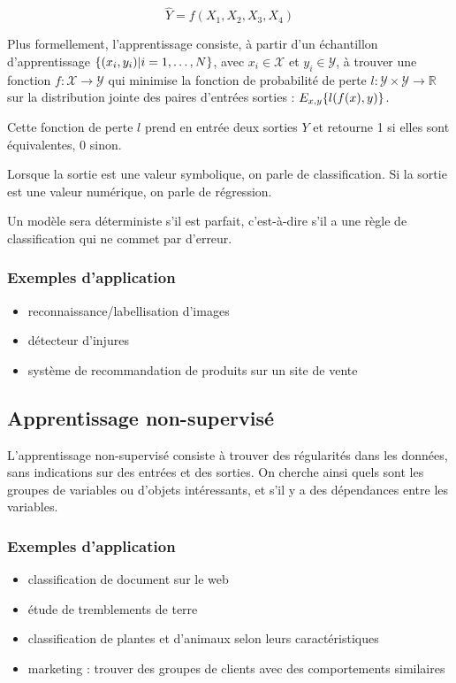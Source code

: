 		$$\hat{Y} = f(X_1, X_2, X_3, X_4)$$

		Plus formellement, l'apprentissage consiste, à partir d'un échantillon d'apprentissage $\lbrace (x_i, y_i) \vert i = 1, \dots , N \rbrace$, avec $x_i \in \mathcal{X}$ et $y_i \in \mathcal{Y}$, à trouver une fonction $f : \mathcal{X} \rightarrow \mathcal{Y}$ qui minimise la fonction de probabilité de perte $l : \mathcal{Y} \times \mathcal{Y} \rightarrow \mathbb{R}$ sur la distribution jointe des paires d'entrées sorties : $E_{x, y} \lbrace l(f(x), y) \rbrace$.

		Cette fonction de perte $l$ prend en entrée deux sorties $Y$ et retourne 1 si elles sont équivalentes, 0 sinon.

		Lorsque la sortie est une valeur symbolique, on parle de classification. Si la sortie est une valeur numérique, on parle de régression.

		Un modèle sera déterministe s'il est parfait, c'est-à-dire s'il a une règle de classification qui ne commet par d'erreur.
		
		\subsubsection{Exemples d'application}
			
			\begin{itemize}
				\item reconnaissance/labellisation d'images
				\item détecteur d'injures
				\item système de recommandation de produits sur un site de vente
			\end{itemize}
		
		
		\subsection{Apprentissage non-supervisé}
		
		L'apprentissage non-supervisé consiste à trouver des régularités dans les données, sans indications sur des entrées et des sorties. On cherche ainsi quels sont les groupes de variables ou d'objets intéressants, et s'il y a des dépendances entre les variables.
		
			\subsubsection{Exemples d'application}
			
			\begin{itemize}
				\item classification de document sur le web
				\item étude de tremblements de terre
				\item classification de plantes et d'animaux selon leurs caractéristiques
				\item marketing : trouver des groupes de clients avec des comportements similaires
			\end{itemize}
		
